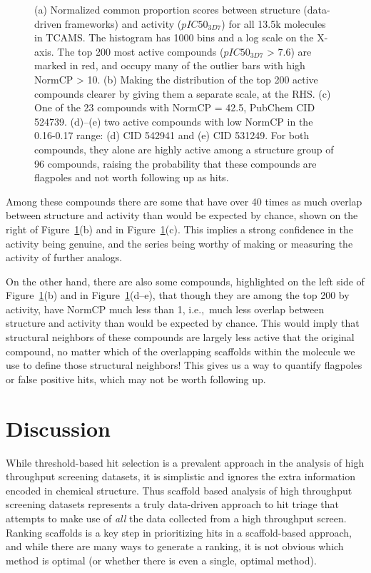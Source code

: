 \documentclass[journal=jacsat,manuscript=article]{achemso}
\newcommand*\fref[1]{Figure~\ref{fig:#1}}
\newcommand*\ie{i.e.,~}
\begin{document}
\begin{figure}
  \caption{(a) Normalized common proportion scores between structure (data-driven frameworks) and activity ($pIC50_{3D7}$) for all 13.5k molecules in TCAMS.  The histogram has 1000 bins and a log scale on the X-axis. The top 200 most active compounds ($pIC50_{3D7}$ > 7.6) are marked in red, and occupy many of the outlier bars with high NormCP > 10. (b) Making the distribution of the top 200 active compounds clearer by giving them a separate scale, at the RHS. (c) One of the 23 compounds with NormCP = 42.5, PubChem CID 524739. (d)--(e) two active compounds with low NormCP in the 0.16-0.17 range: (d) CID 542941 and (e) CID 531249. For both compounds, they alone are highly active among a structure group of 96 compounds, raising the probability that these compounds are flagpoles and not worth following up as hits.}
\label{fig:NormCP}   
\end{figure}

Among these compounds there are some that have over 40 times as much overlap between structure and activity than would be expected by chance, shown on the right of \fref{NormCP}(b) and in \fref{NormCP}(c).  This implies a strong confidence in the activity being genuine, and the series being worthy of making or measuring the activity of further analogs.

On the other hand, there are also some compounds, highlighted on the left side of \fref{NormCP}(b) and in \fref{NormCP}(d--e), that though they are among the top 200 by activity, have NormCP much less than 1, \ie much less overlap between structure and activity than would be expected by chance.  This would imply that structural neighbors of these compounds are largely less active that the original compound, no matter which of the overlapping scaffolds within the molecule we use to define those structural neighbors!  This gives us a way to quantify flagpoles or false positive hits, which may not be worth following up.

\section{Discussion}
\label{sec:discussion}

While threshold-based hit selection is a prevalent approach in the
analysis of high throughput screening datasets, it is simplistic and
ignores the extra information encoded in chemical structure. Thus
scaffold based analysis of high throughput screening datasets
represents a truly data-driven approach to hit triage that attempts to
make use of \emph{all} the data collected from a high throughput
screen. Ranking scaffolds is a key step in prioritizing hits in a
scaffold-based approach, and while there are many ways to generate a
ranking, it is not obvious which method is optimal (or whether there
is even a single, optimal method).
\end{document}
